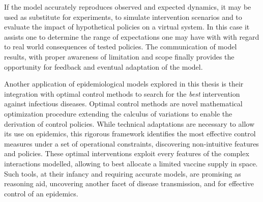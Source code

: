 If the model accurately reproduces observed and expected dynamics, it may be used as substitute for experiments, to simulate intervention scenarios and to evaluate the impact of hypothetical policies on a virtual system. In this case it assists one to determine the range of expectations one may have with with regard to real world consequences of tested policies. The communication of model results, with proper awareness of limitation and scope finally provides the opportunity for feedback and eventual adaptation of the model\cite{Heesterbeek:ModelingInfectiousDisease:2015}.

Another application of epidemiological models explored in this thesis is their integration with optimal control methods to search for the \textit{best} intervention against infectious diseases. Optimal control methods are novel mathematical optimization procedure extending the calculus of variations to enable the derivation of control policies. While technical adaptations are necessary to allow its use on epidemics, this rigorous framework identifies the most effective control measures under a set of operational constraints, discovering non-intuitive features and policies. These optimal interventions exploit every features of the complex interactions modelled, allowing to \eg best allocate a limited vaccine supply in space. Such tools, at their infancy and requiring accurate models, are promising as reasoning aid, uncovering another facet of disease transmission, and for effective control of an epidemics.
